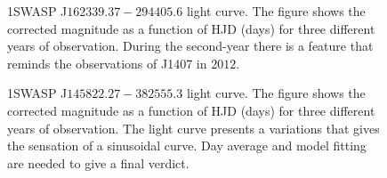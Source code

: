 \begin{figure}[!ht]
\centering
\caption{\scriptsize{1SWASP J$162339.37-294405.6$ light curve. The figure shows the corrected magnitude as a function of HJD (days) for three different years of observation. During the second-year there is a feature that reminds the observations of J1407 in $2012$.}}
\label{fig:SWASP_LightCurve_Spurious}
\end{figure}

\begin{figure}[!ht]
\centering
\caption{\scriptsize{1SWASP J$145822.27-382555.3$ light curve. The figure shows the corrected magnitude as a function of HJD (days) for three different years of observation. The light curve presents a variations that gives the sensation of a sinusoidal curve. Day average and model fitting are needed to give a final verdict.}}
\label{fig:SWASP_LightCurve_2}
\end{figure}



